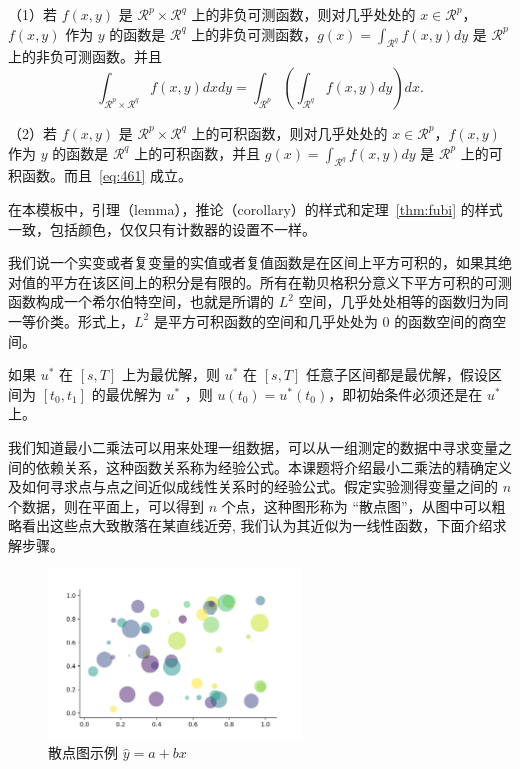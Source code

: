 \documentclass[lang=cn,newtx,10pt,scheme=chinese]{elegantbook}
\begin{document}
\begin{theorem}[Fubini 定理] \label{thm:fubi} 
（1）若 $f(x,y)$ 是 $\mathcal{R}^p\times\mathcal{R}^q$ 上的非负可测函数，则对几乎处处的 $x\in \mathcal{R}^p$，$f(x,y)$ 作为 $y$ 的函数是 $\mathcal{R}^q$ 上的非负可测函数，$g(x)=\int_{\mathcal{R}^q}f(x,y) dy$ 是 $\mathcal{R}^p$ 上的非负可测函数。并且
\begin{equation}
   \label{eq:461}
   \int_{\mathcal{R}^p\times\mathcal{R}^q} f(x,y) dxdy=\int_{\mathcal{R}^p}\left(\int_{\mathcal{R}^q}f(x,y)dy\right)dx.
\end{equation}

（2）若 $f(x,y)$ 是 $\mathcal{R}^p\times\mathcal{R}^q$ 上的可积函数，则对几乎处处的 $x\in\mathcal{R}^p$，$f(x,y)$ 作为 $y$ 的函数是 $\mathcal{R}^q$ 上的可积函数，并且 $g(x)=\int_{\mathcal{R}^q}f(x,y) dy$ 是 $\mathcal{R}^p$ 上的可积函数。而且~\eqref{eq:461} 成立。
\end{theorem}

\begin{note}
在本模板中，引理（lemma），推论（corollary）的样式和定理~\ref{thm:fubi} 的样式一致，包括颜色，仅仅只有计数器的设置不一样。
\end{note}

我们说一个实变或者复变量的实值或者复值函数是在区间上平方可积的，如果其绝对值的平方在该区间上的积分是有限的。所有在勒贝格积分意义下平方可积的可测函数构成一个希尔伯特空间，也就是所谓的 $L^2$ 空间，几乎处处相等的函数归为同一等价类。形式上，$L^2$ 是平方可积函数的空间和几乎处处为 0 的函数空间的商空间。

\begin{proposition}[最优性原理] \label{pro:max}
如果 $u^*$ 在 $[s,T]$ 上为最优解，则 $u^*$ 在 $[s, T]$ 任意子区间都是最优解，假设区间为 $[t_0, t_1]$ 的最优解为 $u^*$ ，则 $u(t_0)=u^{*}(t_0)$，即初始条件必须还是在 $u^*$ 上。
\end{proposition}

我们知道最小二乘法可以用来处理一组数据，可以从一组测定的数据中寻求变量之间的依赖关系，这种函数关系称为经验公式。本课题将介绍最小二乘法的精确定义及如何寻求点与点之间近似成线性关系时的经验公式。假定实验测得变量之间的 $n$ 个数据，则在平面上，可以得到 $n$ 个点，这种图形称为 “散点图”，从图中可以粗略看出这些点大致散落在某直线近旁, 我们认为其近似为一线性函数，下面介绍求解步骤。

\begin{figure}[htbp]
  \centering
  \includegraphics[width=0.6\textwidth]{image/scatter.jpg}
  \caption{散点图示例 $\hat{y}=a+bx$ \label{fig:scatter}}
\end{figure}
\end{document}
